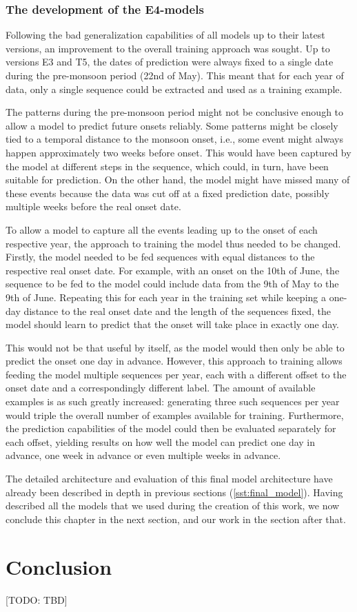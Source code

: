 \subsubsection{The development of the E4-models}
\label{sst:nn_e4}
Following the bad generalization capabilities of all models up to their latest versions, an improvement to the overall training approach was sought. Up to versions E3 and T5, the dates of prediction were always fixed to a single date during the pre-monsoon period (22nd of May). This meant that for each year of data, only a single sequence could be extracted and used as a training example.

The patterns during the pre-monsoon period might not be conclusive enough to allow a model to predict future onsets reliably. Some patterns might be closely tied to a temporal distance to the monsoon onset, i.e., some event might always happen approximately two weeks before onset. This would have been captured by the model at different steps in the sequence, which could, in turn, have been suitable for prediction. On the other hand, the model might have missed many of these events because the data was cut off at a fixed prediction date, possibly multiple weeks before the real onset date.

To allow a model to capture all the events leading up to the onset of each respective year, the approach to training the model thus needed to be changed. Firstly, the model needed to be fed sequences with equal distances to the respective real onset date. For example, with an onset on the 10th of June, the sequence to be fed to the model could include data from the 9th of May to the 9th of June. Repeating this for each year in the training set while keeping a one-day distance to the real onset date and the length of the sequences fixed, the model should learn to predict that the onset will take place in exactly one day.

This would not be that useful by itself, as the model would then only be able to predict the onset one day in advance. However, this approach to training allows feeding the model multiple sequences per year, each with a different offset to the onset date and a correspondingly different label. The amount of available examples is as such greatly increased: generating three such sequences per year would triple the overall number of examples available for training. Furthermore, the prediction capabilities of the model could then be evaluated separately for each offset, yielding results on how well the model can predict one day in advance, one week in advance or even multiple weeks in advance.

The detailed architecture and evaluation of this final model architecture have already been described in depth in previous sections (\cref{sst:final_model}). Having described all the models that we used during the creation of this work, we now conclude this chapter in the next section, and our work in the section after that.

\section{Conclusion}
[TODO: TBD]
